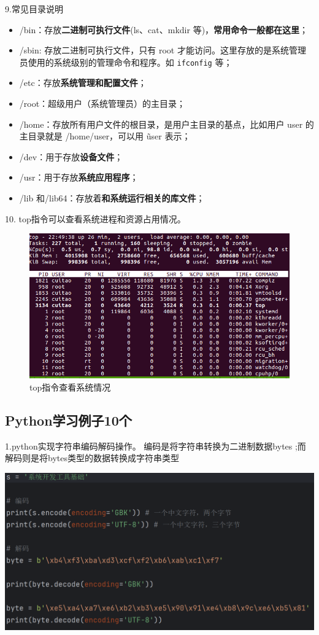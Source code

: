 \documentclass{article}
\begin{document}
9.常见目录说明

\begin{itemize}
    \item /bin：存放\textbf{二进制可执行文件}(ls、cat、mkdir 等)，\textbf{常用命令一般都在这里}；
    \item /sbin: 存放二进制可执行文件，只有 root 才能访问。这里存放的是系统管理员使用的系统级别的管理命令和程序。如 \verb|ifconfig| 等；
    \item /etc：存放\textbf{系统管理和配置文件}；
    \item /root：超级用户（系统管理员）的主目录；
    \item /home：存放所有用户文件的根目录，是用户主目录的基点，比如用户 user 的主目录就是 /home/user，可以用 \~user 表示；
    \item /dev：用于存放\textbf{设备文件}；
    \item /usr：用于存放\textbf{系统应用程序}；
    \item /lib 和/lib64：存放着\textbf{和系统运行相关的库文件}；
\end{itemize}
 



10.
top指令可以查看系统进程和资源占用情况。
\begin{figure}
    \centering
    \includegraphics[width=0.5\linewidth]{top.png}
    \caption{top指令查看系统情况}
    \label{fig:enter-label}
\end{figure}



\subsection{Python学习例子10个}
1.python实现字符串编码解码操作。
    编码是将字符串转换为二进制数据bytes
    ;而解码则是将bytes类型的数据转换成字符串类型

\noindent
\begin{minipage}{\linewidth}
  \centering
  \includegraphics[width=0.5\linewidth]{Python编码解码.png}
  \label{fig:example}
\end{minipage}
\end{document}
